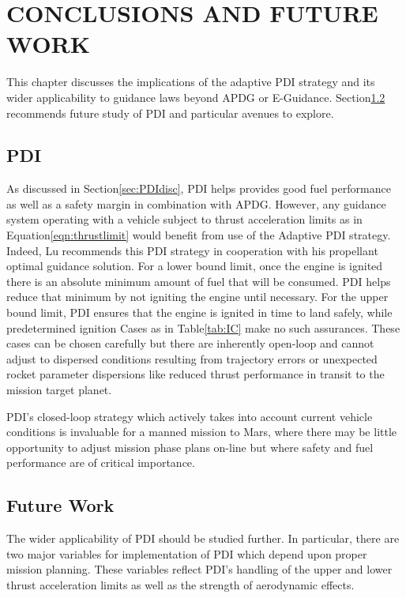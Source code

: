 \chapter{CONCLUSIONS AND FUTURE WORK} \label{chap:conclusions}
This chapter discusses the implications of the adaptive PDI strategy and its wider applicability to guidance laws beyond APDG or E-Guidance. Section\:\ref{sec:futurework} recommends future study of PDI and particular avenues to explore.

\section{PDI}
As discussed in Section\:\ref{sec:PDIdisc}, PDI helps provides good fuel performance as well as a safety margin in combination with APDG. However, any guidance system operating with a vehicle subject to thrust acceleration limits as in Equation\:\ref{eqn:thrustlimit} would benefit from use of the Adaptive PDI strategy. Indeed, Lu recommends this PDI strategy in cooperation with his propellant optimal guidance solution\:\cite{LU}. For a lower bound limit, once the engine is ignited there is an absolute minimum amount of fuel that will be consumed. PDI helps reduce that minimum by not igniting the engine until necessary. For the upper bound limit, PDI ensures that the engine is ignited in time to land safely, while predetermined ignition Cases as in Table\:\ref{tab:IC} make no such assurances. These cases can be chosen carefully but there are inherently open-loop and cannot adjust to dispersed conditions resulting from trajectory errors or unexpected rocket parameter dispersions like reduced thrust performance in transit to the mission target planet.

PDI's closed-loop strategy which actively takes into account current vehicle conditions is invaluable for a manned mission to Mars, where there may be little opportunity to adjust mission phase plans on-line but where safety and fuel performance are of critical importance. 



\section{Future Work} \label{sec:futurework}

The wider applicability of PDI should be studied further. In particular, there are two major variables for implementation of PDI which depend upon proper mission planning. These variables reflect PDI's handling of the upper and lower thrust acceleration limits as well as the strength of aerodynamic effects.

